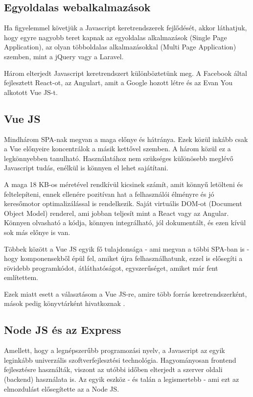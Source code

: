 \subsection{Egyoldalas webalkalmazások}

Ha figyelemmel követjük a Javascript keretrendszerek fejlődését, akkor láthatjuk, hogy egyre nagyobb teret kapnak az egyoldalas alkalmazások (Single Page Application), az olyan többoldalas alkalmazásokkal (Multi Page Application) szemben, mint a jQuery vagy a Laravel.

Három elterjedt Javascript keretrendszert különböztetünk meg. A Facebook által fejlesztett React-ot, az Angulart, amit a Google hozott létre és az Evan You alkotott Vue JS-t.
\cite{vue}

\subsection{Vue JS}

Mindhárom SPA-nak megvan a maga előnye és hátránya. Ezek közül inkább csak a Vue előnyeire koncentrálok a másik kettővel szemben. A három közül ez a legkönnyebben tanulható. Használatához nem szükséges különösebb meglévő Javascript tudás, enélkül is könnyen el lehet sajátítani.

A maga 18 KB-os méretével rendkívül kicsinek számít, amit könnyű letölteni és feltelepíteni, ennek ellenére pozitívan hat a felhasználói élményre és jó keresőmotor optimalizálással is rendelkezik. Saját virtuális DOM-ot (Document Object Model) renderel, ami jobban teljesít mint a React vagy az Angular. Könnyen olvasható a kódja, könnyen integrálható, jól dokumentált, és ezen kívül sok más előnye is van.

Többek között a Vue JS egyik fő tulajdonsága - ami megvan a többi SPA-ban is - hogy komponensekből épül fel, amiket újra felhasználhatunk, ezzel is elősegíti a rövidebb programkódot, átláthatóságot, egyszerűséget, amiket már fent említettem.

Ezek miatt esett a választásom a Vue JS-re, amire több forrás keretrendszerként, mások pedig könyvtárként hivatkoznak
\cite{vue}. %

\subsection{Node JS és az Express}

Amellett, hogy a legnépszerűbb programozási nyelv, a Javascript az egyik leginkább univerzális szoftverfejlesztési technológia. Hagyományosan frontend fejlesztésre használták, viszont az utóbbi időben elterjedt a szerver oldali (backend) használata is. Az egyik eszköz - és talán a legismertebb - ami ezt az elmozdulást elősegítette az a Node JS.

